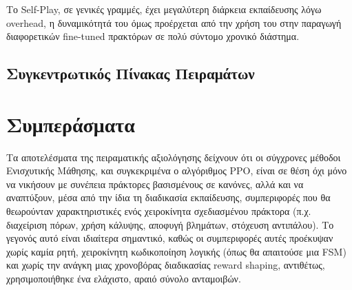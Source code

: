 \documentclass[12pt]{article}
\begin{document}
\begin{table}[H]
	\centering
	\caption{Συγκριτικός πίνακας παραμέτρων και απόδοσης εκπαίδευσης πειραμάτων}
	\label{tab:experiments_summary}
\end{table}

Το Self-Play, σε γενικές γραμμές, έχει μεγαλύτερη διάρκεια εκπαίδευσης λόγω overhead, η δυναμικότητά του όμως προέρχεται από την χρήση του στην παραγωγή διαφορετικών fine-tuned πρακτόρων σε πολύ σύντομο χρονικό διάστημα.

\subsection{Συγκεντρωτικός Πίνακας Πειραμάτων}


\section{Συμπεράσματα}
Τα αποτελέσματα της πειραματικής αξιολόγησης δείχνουν ότι οι σύγχρονες μέθοδοι
Ενισχυτικής Μάθησης, και συγκεκριμένα ο αλγόριθμος PPO, είναι σε θέση όχι μόνο
να νικήσουν με συνέπεια πράκτορες βασισμένους σε κανόνες,
αλλά και να αναπτύξουν, μέσα από την ίδια τη διαδικασία εκπαίδευσης, συμπεριφορές
που θα θεωρούνταν χαρακτηριστικές ενός χειροκίνητα σχεδιασμένου πράκτορα (π.χ.
διαχείριση πόρων, χρήση κάλυψης, αποφυγή βλημάτων, στόχευση αντιπάλου). Το
γεγονός αυτό είναι ιδιαίτερα σημαντικό, καθώς οι συμπεριφορές αυτές προέκυψαν
χωρίς καμία ρητή, χειροκίνητη κωδικοποίηση λογικής (όπως θα απαιτούσε μια FSM)
και χωρίς την ανάγκη μιας χρονοβόρας διαδικασίας reward shaping,
αντιθέτως, χρησιμοποιήθηκε ένα ελάχιστο, αραιό σύνολο ανταμοιβών.
\end{document}
